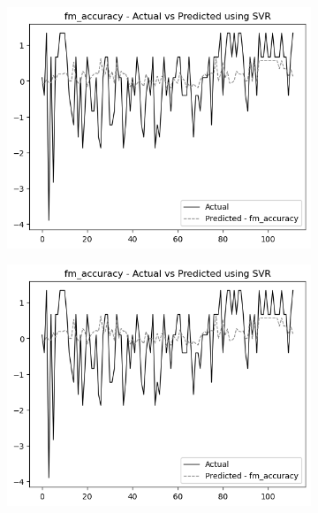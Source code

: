 \begin{figure}
    \begin{subfigure}[b]{0.49\textwidth}
        \centering
        \includegraphics[width=\linewidth]{images/all_data_fine_motor_accuracy.png}
    \end{subfigure}\hfill
    \begin{subfigure}[b]{0.49\textwidth}
        \centering
        \includegraphics[width=\linewidth]{images/all_data_fine_motor_accuracy.png}
    \end{subfigure}
    

\end{figure}
